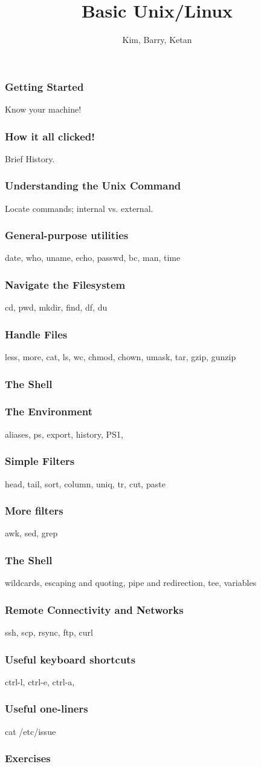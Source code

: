\documentclass[hyperref={pdfpagelabels=false},12pt]{beamer}
\title[Basic Unix/Linux]{{Basic Unix/Linux}}
\author[Basic Unix/Linux]{{Kim, Barry, Ketan}}
\date{}
\begin{document}
\begin{frame}[plain]
\titlepage
\end{frame}

\begin{frame}
\frametitle{Getting Started}
Know your machine!
\end{frame}

\begin{frame}
\frametitle{How it all clicked!}
Brief History.
\end{frame}

\begin{frame}
\frametitle{Understanding the Unix Command}
Locate commands; internal vs. external.
\end{frame}

\begin{frame}
\frametitle{General-purpose utilities}
date, who, uname, echo, passwd, bc, man, time
\end{frame}

\begin{frame}
\frametitle{Navigate the Filesystem}
cd, pwd, mkdir, find, df, du
\end{frame}

\begin{frame}
\frametitle{Handle Files}
less, more, cat, ls, wc, chmod, chown, umask, tar, gzip, gunzip
\end{frame}

\begin{frame}
\frametitle{The Shell}
\end{frame}

\begin{frame}
\frametitle{The Environment}
aliases, ps, export, history, PS1, 
\end{frame}

\begin{frame}
\frametitle{Simple Filters}
head, tail, sort, column, uniq, tr, cut, paste 
\end{frame}

\begin{frame}
\frametitle{More filters}
awk, sed, grep
\end{frame}

\begin{frame}
\frametitle{The Shell}
wildcards, escaping and quoting, pipe and redirection, tee, variables
\end{frame}

\begin{frame}
\frametitle{Remote Connectivity and Networks}
ssh, scp, rsync, ftp, curl
\end{frame}

\begin{frame}
\frametitle{Useful keyboard shortcuts}
ctrl-l, ctrl-e, ctrl-a, 
\end{frame}

\begin{frame}
\frametitle{Useful one-liners}
cat /etc/issue
\end{frame}

\begin{frame}
\frametitle{Exercises}
\end{frame}
\end{document}
